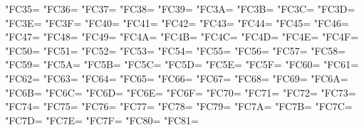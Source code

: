 \XeTeXcharclass"FC35=\KclassArabU
\XeTeXcharclass"FC36=\KclassArabU
\XeTeXcharclass"FC37=\KclassArabU
\XeTeXcharclass"FC38=\KclassArabU
\XeTeXcharclass"FC39=\KclassArabU
\XeTeXcharclass"FC3A=\KclassArabU
\XeTeXcharclass"FC3B=\KclassArabU
\XeTeXcharclass"FC3C=\KclassArabU
\XeTeXcharclass"FC3D=\KclassArabU
\XeTeXcharclass"FC3E=\KclassArabU
\XeTeXcharclass"FC3F=\KclassArabU
\XeTeXcharclass"FC40=\KclassArabU
\XeTeXcharclass"FC41=\KclassArabU
\XeTeXcharclass"FC42=\KclassArabU
\XeTeXcharclass"FC43=\KclassArabU
\XeTeXcharclass"FC44=\KclassArabU
\XeTeXcharclass"FC45=\KclassArabU
\XeTeXcharclass"FC46=\KclassArabU
\XeTeXcharclass"FC47=\KclassArabU
\XeTeXcharclass"FC48=\KclassArabU
\XeTeXcharclass"FC49=\KclassArabU
\XeTeXcharclass"FC4A=\KclassArabU
\XeTeXcharclass"FC4B=\KclassArabU
\XeTeXcharclass"FC4C=\KclassArabU
\XeTeXcharclass"FC4D=\KclassArabU
\XeTeXcharclass"FC4E=\KclassArabU
\XeTeXcharclass"FC4F=\KclassArabU
\XeTeXcharclass"FC50=\KclassArabU
\XeTeXcharclass"FC51=\KclassArabU
\XeTeXcharclass"FC52=\KclassArabU
\XeTeXcharclass"FC53=\KclassArabU
\XeTeXcharclass"FC54=\KclassArabU
\XeTeXcharclass"FC55=\KclassArabU
\XeTeXcharclass"FC56=\KclassArabU
\XeTeXcharclass"FC57=\KclassArabU
\XeTeXcharclass"FC58=\KclassArabU
\XeTeXcharclass"FC59=\KclassArabU
\XeTeXcharclass"FC5A=\KclassArabU
\XeTeXcharclass"FC5B=\KclassArabU
\XeTeXcharclass"FC5C=\KclassArabU
\XeTeXcharclass"FC5D=\KclassArabU
\XeTeXcharclass"FC5E=\KclassArabU
\XeTeXcharclass"FC5F=\KclassArabU
\XeTeXcharclass"FC60=\KclassArabU
\XeTeXcharclass"FC61=\KclassArabU
\XeTeXcharclass"FC62=\KclassArabU
\XeTeXcharclass"FC63=\KclassArabU
\XeTeXcharclass"FC64=\KclassArabU
\XeTeXcharclass"FC65=\KclassArabU
\XeTeXcharclass"FC66=\KclassArabU
\XeTeXcharclass"FC67=\KclassArabU
\XeTeXcharclass"FC68=\KclassArabU
\XeTeXcharclass"FC69=\KclassArabU
\XeTeXcharclass"FC6A=\KclassArabU
\XeTeXcharclass"FC6B=\KclassArabU
\XeTeXcharclass"FC6C=\KclassArabU
\XeTeXcharclass"FC6D=\KclassArabU
\XeTeXcharclass"FC6E=\KclassArabU
\XeTeXcharclass"FC6F=\KclassArabU
\XeTeXcharclass"FC70=\KclassArabU
\XeTeXcharclass"FC71=\KclassArabU
\XeTeXcharclass"FC72=\KclassArabU
\XeTeXcharclass"FC73=\KclassArabU
\XeTeXcharclass"FC74=\KclassArabU
\XeTeXcharclass"FC75=\KclassArabU
\XeTeXcharclass"FC76=\KclassArabU
\XeTeXcharclass"FC77=\KclassArabU
\XeTeXcharclass"FC78=\KclassArabU
\XeTeXcharclass"FC79=\KclassArabU
\XeTeXcharclass"FC7A=\KclassArabU
\XeTeXcharclass"FC7B=\KclassArabU
\XeTeXcharclass"FC7C=\KclassArabU
\XeTeXcharclass"FC7D=\KclassArabU
\XeTeXcharclass"FC7E=\KclassArabU
\XeTeXcharclass"FC7F=\KclassArabU
\XeTeXcharclass"FC80=\KclassArabU
\XeTeXcharclass"FC81=\KclassArabU
